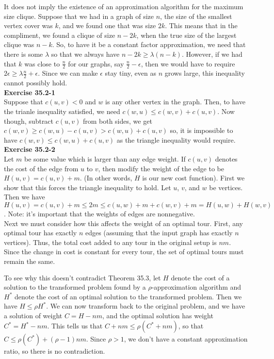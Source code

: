\documentclass{article}
\begin{document}
It does not imply the existence of an approximation algorithm for the maximum size clique. Suppose that we had in a graph of size $n$, the size of the smallest vertex cover was $k$, and we found one that was size $2k$. This means that in the compliment, we found a clique of size $n-2k$, when the true size of the largest clique was $n-k$. So, to have it be a constant factor approximation, we need that there is some $\lambda$ so that we always have $n-2k \ge \lambda (n-k)$. However, if we had that $k$ was close to $\frac{n}{2}$ for our graphs, say $\frac{n}{2}-\epsilon$, then we would have to require $2\epsilon \ge \lambda \frac{n}{2} + \epsilon$. Since we can make $\epsilon$ stay tiny, even as $n$ grows large, this inequality cannot possibly hold.\\




\noindent\textbf{Exercise 35.2-1}\\

Suppose that $c(u,v) < 0$ and $w$ is any other vertex in the graph. Then, to have the trianle inequality satisfied, we need $c(w,u) \le c(w,v) + c(u,v)$. Now though, subtract $c(u,v)$ from both sides, we get $c(w,v) \ge c(w,u) - c(u,v) > c(w,u) +c(u,v)$ so, it is impossible to have $c(w,v) \le c(w,u)+c(u,v)$ as the triangle inequality would require.\\

\noindent\textbf{Exercise 35.2-2}\\

Let $m$ be some value which is larger than any edge weight.  If $c(u,v)$ denotes the cost of the edge from $u$ to $v$, then modify the weight of the edge to be $H(u,v) = c(u,v) + m$.  (In other words, $H$ is our new cost function).  First we show that this forces the triangle inequality to hold.  Let $u$, $v$, and $w$ be vertices.  Then we have $H(u,v) = c(u,v) + m \leq 2m \leq c(u,w) + m + c(w,v) + m = H(u,w) + H(w,v)$.  Note: it's important that the weights of edges are nonnegative.  \\

Next we must consider how this affects the weight of an optimal tour. First, any optimal tour has exactly $n$ edges (assuming that the input graph has exactly $n$ vertices).  Thus, the total cost added to any tour in the original setup is $nm$.  Since the change in cost is constant for every tour, the set of optimal tours must remain the same.  

To see why this doesn't contradict Theorem 35.3, let $H$ denote the cost of a solution to the transformed problem found by a $\rho$-approximation algorithm and $H^*$ denote the cost of an optimal solution to the transformed problem.  Then we have $H \leq \rho H^*$.  We can now transform back to the original problem, and we have a solution of weight $C = H - nm$, and the optimal solution has weight $C^* = H^* - nm$.  This tells us that  $C + nm \leq \rho (C^* + nm)$, so that $C \leq \rho(C^*) + (\rho - 1)nm$.  Since $\rho > 1$, we don't have a constant approximation ratio, so there is no contradiction. \\
\end{document}
